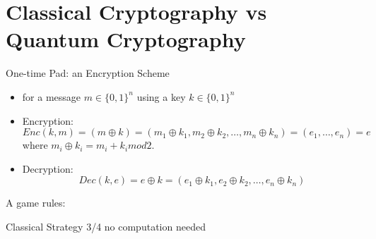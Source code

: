 \documentclass[handout, 10 pt]{beamer}
\begin{document}
\section{Classical Cryptography vs Quantum Cryptography}


\begin{frame}{One-time Pad: an Encryption Scheme}
\begin{itemize}
    \item for a message $m \in \{0, 1\}^n$ using a key $k \in \{0, 1\}^n$
    \pause
    \item Encryption:
    \begin{equation}
    Enc(k,m)=(m \oplus k)=(m_1 \oplus k_1, m_2 \oplus k_2, \hdots, m_n \oplus k_n)=(e_1, \hdots, e_n)=e
    \end{equation}
    where $m_i \oplus k_i = m_i + k_i mod 2$.
    \pause
    \item Decryption:
    \begin{equation}
Dec(k, e)=e \oplus k = (e_1 \oplus k_1, e_2 \oplus k_2, \hdots, e_n \oplus k_n)
\end{equation}

\end{itemize}
\end{frame}

\begin{frame}{A game}
    rules:
\end{frame}

\begin{frame}{Classical Strategy}
    3/4 no computation needed
\end{frame}
\end{document}
